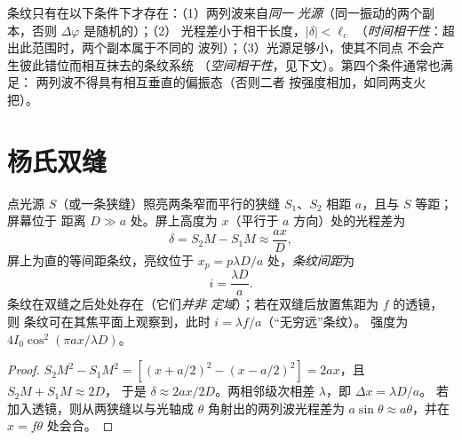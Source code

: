 \begin{remark}[三个条件]\label{rem:b2:two-wave-interference:conditions}
条纹只有在以下条件下才存在：（1）两列波来自\emph{同一
光源}（同一振动的两个副本，否则 $\Delta\varphi$ 是随机的）；（2）
光程差小于相干长度，$|\delta| < \ell_c$
（\emph{时间相干性}：超出此范围时，两个副本属于不同的
波列）；（3）光源足够小，使其不同点
不会产生彼此错位而相互抹去的条纹系统
（\emph{空间相干性}，见下文）。第四个条件通常也满足：
两列波不得具有相互垂直的偏振态（否则二者
按强度相加，如同两支火把）。
\end{remark}

\section{杨氏双缝}

\begin{proposition}\label{prop:b2:two-wave-interference:young}
点光源 $S$（或一条狭缝）照亮两条窄而平行的狭缝
$S_1$、$S_2$ 相距 $a$，且与 $S$ 等距；屏幕位于
距离 $D \gg a$ 处。屏上高度为 $x$（平行于
$a$ 方向）处的光程差为
\[
\delta = S_2M - S_1M \approx \frac{ax}D ,
\]
屏上为直的等间距条纹，亮纹位于 $x_p =
p\lambda D/a$ 处，\emph{条纹间距}为
\[
i = \frac{\lambda D}a .
\]
条纹在双缝之后处处存在（它们\emph{并非
定域}）；若在双缝后放置焦距为 $f$ 的透镜，则
条纹可在其焦平面上观察到，此时 $i = \lambda f/a$（“无穷远”条纹）。
强度为 $4I_0\cos^2(\pi ax/\lambda D)$。
\end{proposition}

\begin{proof}
$S_2M^2 - S_1M^2 = [(x + a/2)^2 - (x - a/2)^2] = 2ax$，且 $S_2M + S_1M \approx 2D$，
于是 $\delta \approx 2ax/2D$。两相邻级次相差 $\lambda$，即 $\Delta x = \lambda D/a$。
若加入透镜，则从两狭缝以与光轴成 $\theta$
角射出的两列波光程差为 $a\sin\theta \approx a\theta$，并在 $x = f\theta$ 处会合。
\end{proof}

